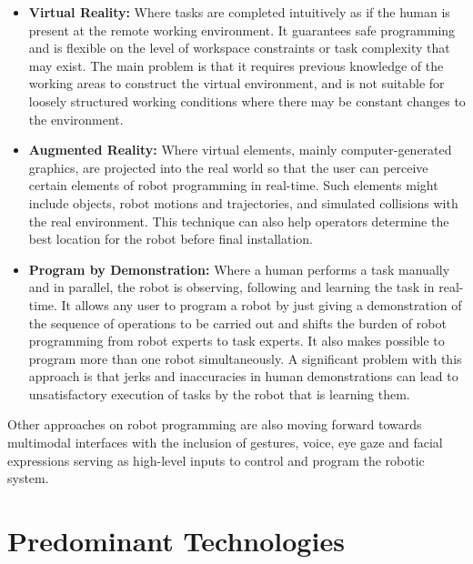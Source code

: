 \begin{itemize}
    \item \textbf{Virtual Reality: }Where tasks are completed intuitively as if the human is present at the remote working environment. It guarantees safe programming and is flexible on the level of workspace constraints or task complexity that may exist. The main problem is that it requires previous knowledge of the working areas to construct the virtual environment, and is not suitable for loosely structured working conditions where there may be constant changes to the environment.
    \item \textbf{Augmented Reality: }Where virtual elements, mainly computer-generated graphics, are projected into the real world so that the user can perceive certain elements of robot programming in real-time. Such elements might include objects, robot motions and trajectories, and  simulated collisions with the real environment. This technique can also help operators determine the best location for the robot before final installation.
    \item \textbf{Program by Demonstration: }Where a human performs a task manually and in parallel, the robot is observing, following and learning the task in real-time. It allows any user to program a robot by just giving a demonstration of the sequence of operations to be carried out and shifts the burden of robot programming from robot experts to task experts. It also makes possible to program more than one robot simultaneously. A significant problem with this approach is that jerks and inaccuracies in human demonstrations can lead to unsatisfactory execution of tasks by the robot that is learning them.
\end{itemize}


\par Other approaches on robot programming are also moving forward towards multimodal interfaces with the inclusion of gestures, voice, eye gaze and facial expressions serving as high-level inputs to control and program the robotic system.





\section{Predominant Technologies}

